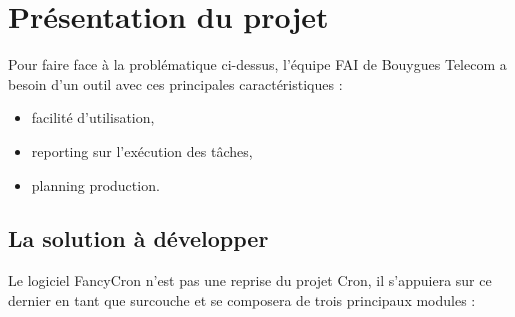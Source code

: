 \documentclass{bouygues-fr}
\begin{document}
\newpage
\chapter{Présentation du projet}

Pour faire face à la problématique ci-dessus, l'équipe  FAI de Bouygues Telecom a besoin d'un outil avec ces principales caractéristiques :
\begin{itemize}
\item facilité d'utilisation,
\item reporting sur l'exécution des tâches,
\item planning production.
\end{itemize}

\section{La solution à développer}
Le logiciel FancyCron n'est pas une reprise du projet Cron, il s'appuiera sur ce dernier en tant que surcouche et se composera de trois principaux modules :
\end{document}
